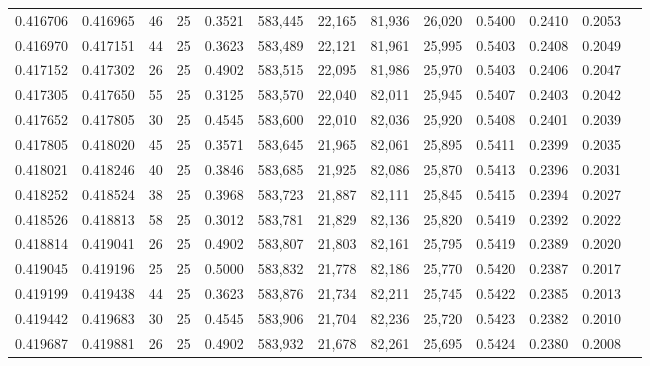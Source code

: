 \begin{tabular}{rrrrrrrrrrrrr}
0.416706 & 0.416965 &    46 &  25 &                                     0.3521 & 583,445 &  22,165 &  81,936 &  26,020 & 0.5400 & 0.2410 & 0.2053 \\
0.416970 & 0.417151 &    44 &  25 &                                     0.3623 & 583,489 &  22,121 &  81,961 &  25,995 & 0.5403 & 0.2408 & 0.2049 \\
0.417152 & 0.417302 &    26 &  25 &                                     0.4902 & 583,515 &  22,095 &  81,986 &  25,970 & 0.5403 & 0.2406 & 0.2047 \\
0.417305 & 0.417650 &    55 &  25 &                                     0.3125 & 583,570 &  22,040 &  82,011 &  25,945 & 0.5407 & 0.2403 & 0.2042 \\
0.417652 & 0.417805 &    30 &  25 &                                     0.4545 & 583,600 &  22,010 &  82,036 &  25,920 & 0.5408 & 0.2401 & 0.2039 \\
0.417805 & 0.418020 &    45 &  25 &                                     0.3571 & 583,645 &  21,965 &  82,061 &  25,895 & 0.5411 & 0.2399 & 0.2035 \\
0.418021 & 0.418246 &    40 &  25 &                                     0.3846 & 583,685 &  21,925 &  82,086 &  25,870 & 0.5413 & 0.2396 & 0.2031 \\
0.418252 & 0.418524 &    38 &  25 &                                     0.3968 & 583,723 &  21,887 &  82,111 &  25,845 & 0.5415 & 0.2394 & 0.2027 \\
0.418526 & 0.418813 &    58 &  25 &                                     0.3012 & 583,781 &  21,829 &  82,136 &  25,820 & 0.5419 & 0.2392 & 0.2022 \\
0.418814 & 0.419041 &    26 &  25 &                                     0.4902 & 583,807 &  21,803 &  82,161 &  25,795 & 0.5419 & 0.2389 & 0.2020 \\
0.419045 & 0.419196 &    25 &  25 &                                     0.5000 & 583,832 &  21,778 &  82,186 &  25,770 & 0.5420 & 0.2387 & 0.2017 \\
0.419199 & 0.419438 &    44 &  25 &                                     0.3623 & 583,876 &  21,734 &  82,211 &  25,745 & 0.5422 & 0.2385 & 0.2013 \\
0.419442 & 0.419683 &    30 &  25 &                                     0.4545 & 583,906 &  21,704 &  82,236 &  25,720 & 0.5423 & 0.2382 & 0.2010 \\
0.419687 & 0.419881 &    26 &  25 &                                     0.4902 & 583,932 &  21,678 &  82,261 &  25,695 & 0.5424 & 0.2380 & 0.2008 \\

\end{tabular}

